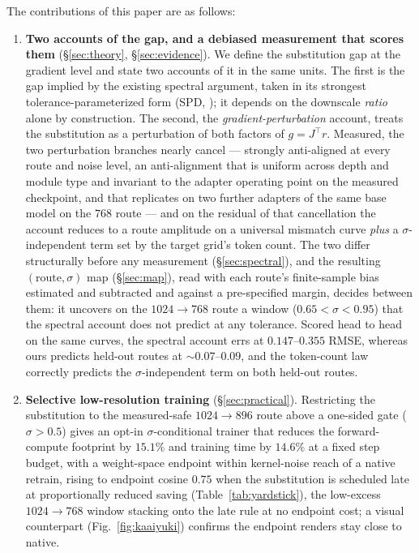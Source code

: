 The contributions of this paper are as follows:

\begin{enumerate}
\item \textbf{Two accounts of the gap, and a debiased measurement
that scores them} (\S\ref{sec:theory}, \S\ref{sec:evidence}). We
define the substitution gap at the gradient level and state two
accounts of it in the same units. The first is the gap
implied by the existing spectral argument, taken in its strongest
tolerance-parameterized form (SPD, \citealp{xiao2026spd}); it
depends on the downscale \emph{ratio} alone by construction. The
second, the \emph{gradient-perturbation} account, treats the
substitution as a perturbation of
both factors of $g = J^{\!\top}r$. Measured, the two perturbation
branches nearly cancel --- strongly anti-aligned at every route and
noise level, an anti-alignment that is uniform across depth and
module type and invariant to the adapter operating point on the
measured checkpoint, and that replicates on two further adapters of
the same base model on the $768$ route --- and on the residual of
that cancellation the account reduces to a route amplitude on a
universal mismatch curve \emph{plus} a $\sigma$-independent term set
by the target grid's token count. The two differ structurally before
any measurement (\S\ref{sec:spectral}), and the resulting
$(\text{route}, \sigma)$ map (\S\ref{sec:map}), read with each
route's finite-sample bias estimated and subtracted and against a
pre-specified margin, decides between them: it uncovers on the
$1024{\to}768$ route a window ($0.65 < \sigma < 0.95$) that the
spectral account does not predict at any tolerance. Scored head to
head on the same curves, the spectral account errs at $0.147$--$0.355$
RMSE, whereas ours predicts held-out routes at ${\sim}0.07$--$0.09$,
and the token-count law correctly predicts the $\sigma$-independent
term on both held-out routes.
\item \textbf{Selective low-resolution training} (\S\ref{sec:practical}).
Restricting the substitution to the measured-safe $1024{\to}896$
route above a one-sided gate ($\sigma > 0.5$) gives
an opt-in $\sigma$-conditional trainer that reduces the forward-compute
footprint by $15.1\%$ and training time by $14.6\%$ at a fixed step
budget, with a weight-space endpoint within kernel-noise reach of a
native retrain, rising to endpoint cosine $0.75$ when the
substitution is scheduled late at proportionally reduced saving
(Table~\ref{tab:yardstick}), the low-excess $1024{\to}768$ window
stacking onto the late rule at no endpoint cost; a visual
counterpart (Fig.~\ref{fig:kaaiyuki}) confirms the endpoint renders
stay close to native.
\end{enumerate}

